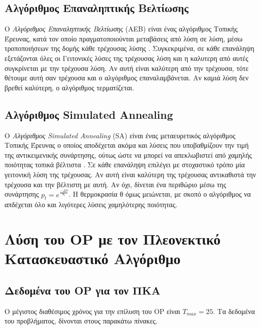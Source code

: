 \documentclass[12pt, a4paper]{article}
\begin{document}
\subsection{Αλγόριθμος Επαναληπτικής Βελτίωσης}
Ο \textit{Αλγόριθμος Επαναληπτικής Βελτίωσης} (ΑΕΒ) είναι ένας αλγόριθμος Τοπικής Έρευνας, κατά τον οποίο πραγματοποιούνται μεταβάσεις από λύση σε λύση, μέσω τροποποιήσεων της δομής κάθε τρέχουσας λύσης \cite{Lecture9}. Συγκεκριμένα, σε κάθε επανάληψη εξετάζονται όλες οι Γειτονικές λύσες της τρέχουσας λύση και η καλυτερη από αυτές συγκρίνεται με την τρέχουσα λύση. Αν αυτή είναι καλύτερη από την τρέχουσα, τότε θέτουμε αυτή σαν τρέχουσα και ο αλγόριθμος επαναλαμβάνεται. Αν καμιά λύση δεν βρεθεί καλύτερη, ο αλγόριθμος τερματίζεται.

\subsection{Αλγόριθμος Simulated Annealing}
Ο \textit{Αλγόριθμος Simulated Annealing} (SA) είναι ένας μεταευρετικός αλγόριθμος Τοπικής Έρευνας ο οποίος αποδέχεται ακόμα και λύσεις που υποβαθμίζουν την τιμή της αντικειμενικής συνάρτησης, ούτως ώστε να μπορεί να απεκλωβιστεί από χαμηλής ποιότητας τοπικά βέλτιστα \cite{Lecture13}. Σε κάθε επανάληψη επιλέγει με στοχαστικό τρόπο μία γειτονική λύση της τρέχουσας. Αν αυτή είναι καλύτερη της τρέχουσας αντικαθιστά την τρέχουσα και την βέλτιστη με αυτή. Αν όχι, δίνεται ένα περιθώριο μέσω της συνάρτησης \(p_t = e^{\frac{-\Delta S}{\theta_t}}\). Η θερμοκρασία θ όμως μειώνεται, με σκοπό ο αλγόριθμος να απδέχεται όλο και λιγότερες λύσεις χαμηλότερης ποιότητας.


\section{Λύση του OP με τον Πλεονεκτικό Κατασκευαστικό Αλγόριθμο}

\subsection{Δεδομένα του OP για τον ΠΚΑ}

Ο μέγιστος διαθέσιμος χρόνος για την επίλυση του OP είναι \(T_{max} = 25\). Τα δεδομένα του προβλήματος, δίνονται στους παρακάτω πίνακες. \\
\end{document}
